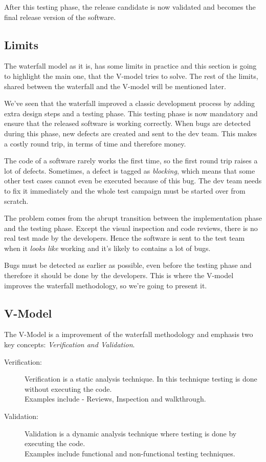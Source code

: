 After this testing phase, the release candidate is now validated and becomes
the final release version of the software.

\subsection{Limits}\label{subsec:waterfall-limits}
The waterfall model as it is, has some limits in practice and this section is
going to highlight the main one, that the V-model tries to solve.
The rest of the limits, shared between the waterfall and the V-model will be
mentioned later.

We've seen that the waterfall improved a classic development process by
adding extra design steps and a testing phase.
This testing phase is now mandatory and ensure that the released software is
working correctly.
When bugs are detected during this phase, new defects are created and sent to
the dev team.
This makes a costly round trip, in terms of time and therefore money.

The code of a software rarely works the first time, so the first round trip
raises a lot of defects.
Sometimes, a defect is tagged as \textit{blocking}, which means that some other
test cases cannot even be executed because of this bug.
The dev team needs to fix it immediately and the whole test campaign must be
started over from scratch.

The problem comes from the abrupt transition between the implementation phase
and the testing phase.
Except the visual inspection and code reviews, there is no real test made by
the developers.
Hence the software is sent to the test team when it \textit{looks like}
working and it's likely to contains a lot of bugs.

Bugs must be detected as earlier as possible, even before the
testing phase and therefore it should be done by the developers.
This is where the V-model improves the waterfall methodology, so we're going to
present it.

\subsection{V-Model}\label{subsec:v-model}
The V-Model is a improvement of the waterfall methodology and emphasis
two key concepts: \textit{Verification and Validation}.
\begin{description}
    \item[Verification:] Verification is a static analysis technique.
    In this technique testing is done without executing the code. \\
    Examples include - Reviews, Inspection and walkthrough.
    \item[Validation:] Validation is a dynamic analysis technique where
    testing is done by executing the code. \\
    Examples include functional and non-functional testing techniques.
\end{description}

